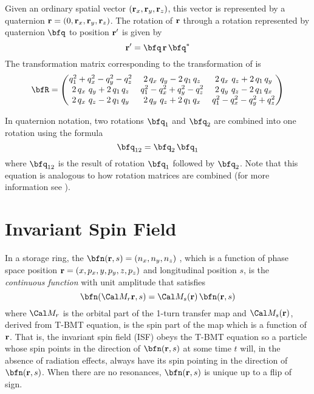 {Given an ordinary spatial vector $({\bf r}_x, {\bf r}_y, {\bf r}_z)$, this vector is represented by a
quaternion ${\bf r} = (0, {\bf r}_x, {\bf r}_y, {\bf r}_z)$. The rotation of ${\bf r}$ through a rotation
represented by quaternion $\bfq$ to position ${\bf r}'$ is given by
\begin{equation}
  \bfr' = \bfq \, \bfr \, \bfq^*
  \label{rqrq}
\end{equation}
The transformation matrix corresponding to the transformation of  is
\begin{equation}
  \bfR = \begin{pmatrix}
    q_1^2 + q_x^2 - q_y^2 - q_z^2    & 2 \, q_x \ q_y - 2 \, q_1 \, q_z & 2 \, q_x \ q_z + 2 \, q_1 \, q_y \\
    2 \, q_x \ q_y + 2 \, q_1 \, q_z & q_1^2 - q_x^2 + q_y^2 - q_z^2    & 2 \, q_y \ q_z - 2 \, q_1 \, q_x \\
    2 \, q_x \ q_z - 2 \, q_1 \, q_y & 2 \, q_y \ q_z + 2 \, q_1 \, q_x & q_1^2 - q_x^2 - q_y^2 + q_z^2 
  \end{pmatrix}
  \label{rqqq}
\end{equation}

In quaternion notation, two rotations $\bfq_1$ and $\bfq_2$ are combined into one rotation using the formula
\begin{equation}
  \bfq_{12} = \bfq_2 \, \bfq_1
\end{equation}
where $\bfq_{12}$ is the result of rotation $\bfq_1$ followed by $\bfq_2$. Note that this equation
is analogous to how rotation matrices are combined (for more information see \cite{b:quat}).

\section{Invariant Spin Field}
\label{s:isf}

In a storage ring, the  $\bfn(\bfr, s) = (n_x, n_y, n_z)$
\cite{b:spin.hoff,b:duan15}, which is a function of phase space position ${\bf r} = (x, p_x, y, p_y, z,
p_z)$ and longitudinal position $s$, is the {\em continuous function} with unit amplitude that
satisfies
\begin{equation}
  \bfn(\Cal M_r \bfr, s) = \Cal M_s(\bfr) \, \bfn(\bfr, s)
  \label{nmrs}
\end{equation}
where $\Cal M_r$ is the orbital part of the 1-turn transfer map and $\Cal M_s(\bfr)$, derived from
T-BMT equation, is the spin part of the map which is a function of ${\bf r}$. That is, the invariant
spin field (ISF) obeys the T-BMT equation so a particle whose spin points in the direction of
$\bfn(\bfr, s)$ at some time $t$ will, in the absence of radiation effects, always have its spin
pointing in the direction of $\bfn(\bfr, s)$. When there are no resonances, $\bfn(\bfr, s)$ is
unique up to a flip of sign.

}
